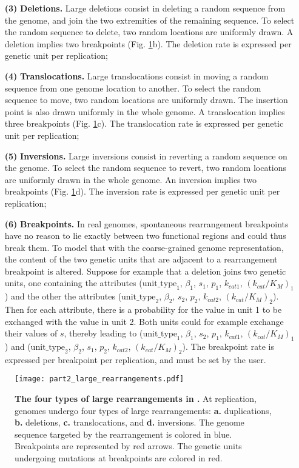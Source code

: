 \begin{enumerate}
\item[\textbf{(3)}] \textbf{Deletions.} Large deletions consist in deleting a random sequence from the genome, and join the two extremities of the remaining sequence. To select the random sequence to delete, two random locations are uniformly drawn. A deletion implies two breakpoints (Fig. \ref{fig:part2:methodology:large_rearrangements}b). The deletion rate is expressed per genetic unit per replication;
\item[\textbf{(4)}] \textbf{Translocations.} Large translocations consist in moving a random sequence from one genome location to another. To select the random sequence to move, two random locations are uniformly drawn. The insertion point is also drawn uniformly in the whole genome. A translocation implies three breakpoints (Fig. \ref{fig:part2:methodology:large_rearrangements}c). The translocation rate is expressed per genetic unit per replication;
\item[\textbf{(5)}] \textbf{Inversions.} Large inversions consist in reverting a random sequence on the genome. To select the random sequence to revert, two random locations are uniformly drawn in the whole genome. An inversion implies two breakpoints (Fig. \ref{fig:part2:methodology:large_rearrangements}d). The inversion rate is expressed per genetic unit per replication;
\item[\textbf{(6)}] \textbf{Breakpoints.} In real genomes, spontaneous rearrangement breakpoints have no reason to lie exactly between two functional regions and could thus break them. To model that with the coarse-grained genome representation, the content of the two genetic units that are adjacent to a rearrangement breakpoint is altered. Suppose for example that a deletion joins two genetic units, one containing the attributes ($\text{unit\_type}_1$, $\beta_1$, $s_1$, $p_1$, $k_{cat1}$, $(k_{cat}/K_M)_1$) and the other the attributes ($\text{unit\_type}_2$, $\beta_2$, $s_2$, $p_2$, $k_{cat2}$, $(k_{cat}/K_M)_2$). Then for each attribute, there is a probability for the value in unit 1 to be exchanged with the value in unit 2. Both units could for example exchange their values of $s$, thereby leading to ($\text{unit\_type}_1$, $\beta_1$, $s_2$, $p_1$, $k_{cat1}$, $(k_{cat}/K_M)_1$) and ($\text{unit\_type}_2$, $\beta_2$, $s_1$, $p_2$, $k_{cat2}$, $(k_{cat}/K_M)_2$). The breakpoint rate is expressed per breakpoint per replication, and must be set by the user.
\end{enumerate}

\begin{figure}[!h]
\centering 
\texttt{[image: part2\_large\_rearrangements.pdf]}
\caption[The four types of large rearrangements in {\EvoEvoSim}.]{\textbf{The four types of large rearrangements in {\EvoEvoSim}.} At replication, genomes undergo four types of large rearrangements: \textbf{a.} duplications, \textbf{b.} deletions, \textbf{c.} translocations, and \textbf{d.} inversions. The genome sequence targeted by the rearrangement is colored in blue. Breakpoints are represented by red arrows. The genetic units undergoing mutations at breakpoints are colored in red.}
\label{fig:part2:methodology:large_rearrangements}
\end{figure}

